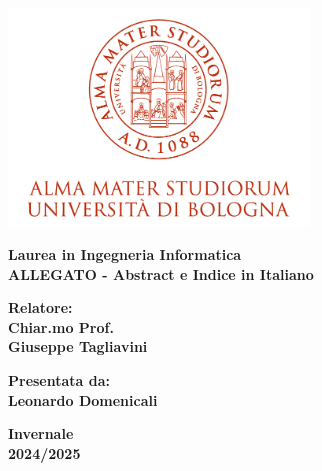 \begin{titlepage}
\begin{center}
\begin{center}
  \includegraphics[width=0.6\textwidth]{../Figures/UniboLogo.png}
\end{center}
\vspace{4em}
{\small{\bf Laurea in Ingegneria Informatica }}\\
\textbf{ALLEGATO - Abstract e Indice in Italiano}
\end{center}
\vspace{15mm}

\vspace{30mm}
\par
\noindent
\begin{minipage}[t]{0.47\textwidth}
{\large{\bf Relatore:\\
Chiar.mo Prof.\\
Giuseppe Tagliavini}}
\end{minipage}
\hfill
\begin{minipage}[t]{0.47\textwidth}\raggedleft
{\large{\bf Presentata da:\\
Leonardo Domenicali}}
\end{minipage}
\vspace{20mm}
\begin{center}
{\large{\bf Invernale\\%
2024/2025 }}%
\end{center}
\end{titlepage}